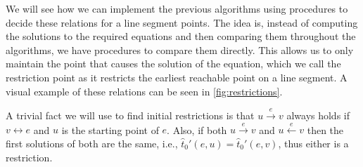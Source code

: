 We will see how we can implement the previous algorithms using procedures to decide these relations for a line segment points. The idea is, instead of computing the solutions to the required equations and then comparing them throughout the algorithms, we have procedures to compare them directly. This allows us to only maintain the point that causes the solution of the equation, which we call the restriction point as it restricts the earliest reachable point on a line segment. A visual example of these relations can be seen in \cref{fig:restrictions}.

A trivial fact we will use to find initial restrictions is that \(u \overset e\rightarrow v\) always holds if \(v \leftrightarrow e\) and \(u\) is the starting point of \(e\). Also, if both \(u \overset e\rightarrow v\) and \(u \overset e\leftarrow v\) then the first solutions of both are the same, i.e., \(\hat t_0'(e, u) = \hat t_0'(e,v)\), thus either is a restriction. 

